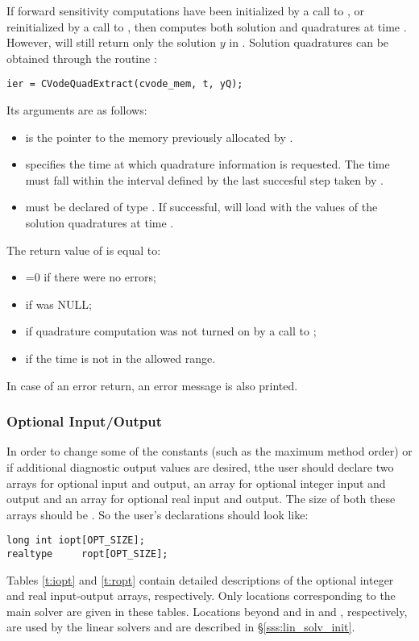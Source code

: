 If forward sensitivity computations have been initialized by a call to ,
or reinitialized by a call to , then {\cvodes} computes both solution
and quadratures at time . However,  will still return only the solution
$y$ in . Solution quadratures can be obtained through the routine
:
\begin{verbatim}
ier = CVodeQuadExtract(cvode_mem, t, yQ);
\end{verbatim}
Its arguments are as follows:
\begin{itemize}
\item {} is the pointer to the memory previously allocated
  by .
\item {} specifies the time at which quadrature information is 
  requested. The time  must fall within the interval defined by the last 
  succesful step taken by {\cvodes}.
\item {} must be declared of type .
  If successful,  will load  with the values of the
  solution quadratures at time .
\end{itemize}
The return value  of  is equal to: 
\begin{itemize}
\item {}=0 if there were no errors; 
\item {} if  was NULL;
\item {} if quadrature computation was not turned on
      by a call to ;
\item {} if the time  is not in the allowed range.
\end{itemize}
In case of an error return, an error message is also printed.  

\subsubsection{Optional Input/Output}\label{sss:optional_io}

In order to change some of the {\cvodes} constants (such as the maximum method order) 
or if additional diagnostic output values are desired, tthe user should declare two 
arrays for optional input and output, an  array for optional integer 
input and output and an  array for optional real input and output. 
The size of both these arrays should be .
So the user's declarations should look like:
\begin{verbatim}
long int iopt[OPT_SIZE];
realtype     ropt[OPT_SIZE];
\end{verbatim}
Tables \ref{t:iopt} and \ref{t:ropt} contain 
detailed descriptions of the optional integer and real input-output arrays,
respectively. Only locations corresponding to the main {\cvodes} solver are 
given in these tables. Locations beyond  and
 in  and , respectively, are used
by the linear solvers and are described in \S\ref{sss:lin_solv_init}.

